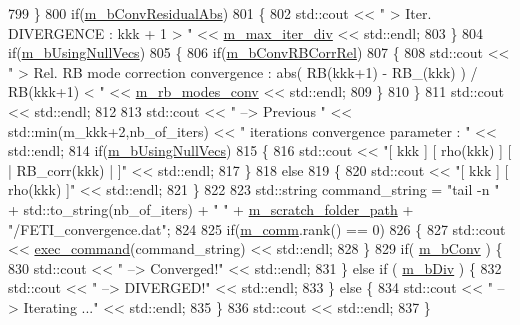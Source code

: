 \begin{DoxyCode}
799     \}
800     \textcolor{keywordflow}{if}(\hyperlink{classcarl_1_1_f_e_t_i___operations_a06ed6c8995fd004aabe207d2a961029e}{m\_bConvResidualAbs})
801     \{
802         std::cout << \textcolor{stringliteral}{"   > Iter. DIVERGENCE : kkk + 1 > "} << \hyperlink{classcarl_1_1_f_e_t_i___operations_ab8f236399e5565019be7dc8825bc00df}{m\_max\_iter\_div} << std::endl;
803     \}
804     \textcolor{keywordflow}{if}(\hyperlink{classcarl_1_1_f_e_t_i___operations_aff68699ccceb6e1debc4ecab97dde2ff}{m\_bUsingNullVecs})
805     \{   
806         \textcolor{keywordflow}{if}(\hyperlink{classcarl_1_1_f_e_t_i___operations_a324e0a6913e912861b38449fb6c482b5}{m\_bConvRBCorrRel})
807         \{
808             std::cout << \textcolor{stringliteral}{"   > Rel. RB mode correction convergence : abs( RB(kkk+1) - RB\_(kkk) ) /
       RB(kkk+1) < "} << \hyperlink{classcarl_1_1_f_e_t_i___operations_a4e5cf9147182d2647b6379453a4ff10d}{m\_rb\_modes\_conv} << std::endl;
809         \}
810     \}
811     std::cout << std::endl;
812 
813     std::cout << \textcolor{stringliteral}{" --> Previous "} << std::min(m\_kkk+2,nb\_of\_iters) << \textcolor{stringliteral}{" iterations convergence parameter : 
      "} << std::endl;
814     \textcolor{keywordflow}{if}(\hyperlink{classcarl_1_1_f_e_t_i___operations_aff68699ccceb6e1debc4ecab97dde2ff}{m\_bUsingNullVecs})
815     \{   
816         std::cout << \textcolor{stringliteral}{"[ kkk ] [ rho(kkk) ] [ | RB\_corr(kkk) | ]"} << std::endl;
817     \}
818     \textcolor{keywordflow}{else}
819     \{
820         std::cout << \textcolor{stringliteral}{"[ kkk ] [ rho(kkk) ]"} << std::endl;
821     \}
822 
823     std::string command\_string = \textcolor{stringliteral}{"tail -n "} + std::to\_string(nb\_of\_iters) + \textcolor{stringliteral}{" "} + 
      \hyperlink{classcarl_1_1_f_e_t_i___operations_ad6d35bc9b5221d45452fbc8931f22055}{m\_scratch\_folder\_path} + \textcolor{stringliteral}{"/FETI\_convergence.dat"};
824 
825     \textcolor{keywordflow}{if}(\hyperlink{classcarl_1_1_f_e_t_i___operations_a8cb0ed286667fc9f3ebc2d8ef2a3e13b}{m\_comm}.rank() == 0)
826     \{
827         std::cout << \hyperlink{namespacecarl_a54249fee021b3d53e1a7ae7208292437}{exec\_command}(command\_string) << std::endl;
828     \}
829     \textcolor{keywordflow}{if}( \hyperlink{classcarl_1_1_f_e_t_i___operations_a4e8e38670cc41dc8de9e9465eda687ba}{m\_bConv} ) \{
830         std::cout << \textcolor{stringliteral}{" --> Converged!"} << std::endl;
831     \} \textcolor{keywordflow}{else} \textcolor{keywordflow}{if} ( \hyperlink{classcarl_1_1_f_e_t_i___operations_a8f5c0b81912f20a3e5768b0da392e039}{m\_bDiv} ) \{
832         std::cout << \textcolor{stringliteral}{" --> DIVERGED!"} << std::endl;
833     \} \textcolor{keywordflow}{else} \{
834         std::cout << \textcolor{stringliteral}{" --> Iterating ..."} << std::endl;
835     \}
836     std::cout << std::endl;
837 \}
\end{DoxyCode}
\hypertarget{classcarl_1_1_f_e_t_i___operations_a6c9eb129b4f4818d66d164edd140fa6e}{}
